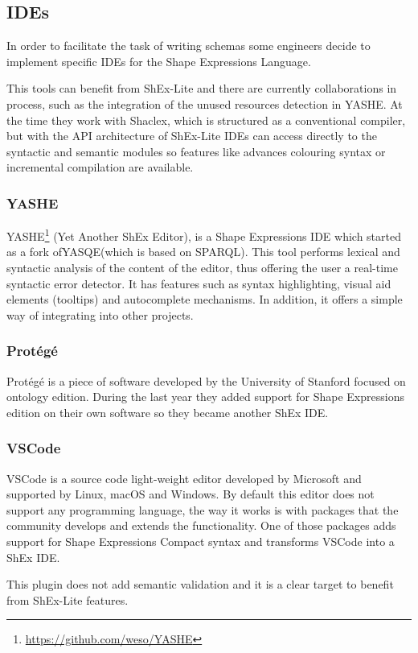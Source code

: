 \subsection{IDEs}
In order to facilitate the task of writing schemas some engineers decide to implement specific IDEs for the
Shape Expressions Language.

This tools can benefit from ShEx-Lite and there are currently collaborations in process, such as the integration
of the unused resources detection in YASHE. At the
time they work with Shaclex, which is structured as a conventional compiler, but with the API architecture
of ShEx-Lite IDEs can access directly to the syntactic and semantic modules so features like advances colouring
syntax or incremental compilation are available.

\subsubsection{YASHE}
YASHE\footnote{\url{https://github.com/weso/YASHE}} (Yet Another ShEx Editor), is a Shape Expressions IDE
which started as a fork ofYASQE(which is based on SPARQL). This tool performs lexical and syntactic analysis
of the content of the editor, thus offering the user a real-time syntactic error detector. It has features
such as syntax highlighting, visual aid elements (tooltips) and autocomplete mechanisms. In addition, it offers
a simple way of integrating into other projects.

\subsubsection{Protégé}
Protégé is a piece of software developed by the University of Stanford focused on ontology edition. During the
last year they added support for Shape Expressions edition on their own software so they became another ShEx IDE.

\subsubsection{VSCode}
VSCode is a source code light-weight editor developed by Microsoft and supported by Linux, macOS and Windows.
By default this editor does not support any programming language, the way it works is with packages that the
community develops and extends the functionality. One of those packages adds support for Shape Expressions
Compact syntax and transforms VSCode into a ShEx IDE.

This plugin does not add semantic validation and it is a clear target to benefit from ShEx-Lite features.

